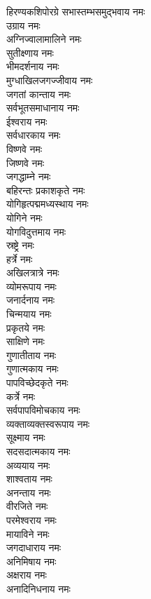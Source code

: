 \begin{multicols}{2}
\begin{flushleft}
हिरण्यकशिपोरग्रे सभास्तम्भसमुद्भवाय नमः\\
उग्राय नमः\hfill{}\\
अग्निज्वालामालिने नमः\\
सुतीक्ष्णाय नमः\\
भीमदर्शनाय नमः\\
मुग्धाखिलजगज्जीवाय नमः\\
जगतां कान्ताय नमः\\
सर्वभूतसमाधानाय नमः\\
ईश्वराय नमः\\
सर्वधारकाय नमः\\
विष्णवे नमः\\
जिष्णवे नमः\hfill{}\\
जगद्धाम्ने नमः\\
बहिरन्तः प्रकाशकृते नमः\\
योगिहृत्पद्ममध्यस्थाय नमः\\
योगिने नमः\\
योगविदुत्तमाय नमः\\
स्रष्ट्रे नमः\\
हर्त्रे नमः\\
अखिलत्रात्रे नमः\\
व्योमरूपाय नमः\\
जनार्दनाय नमः\hfill{}\\
चिन्मयाय नमः\\
प्रकृतये नमः\\
साक्षिणे नमः\\
गुणातीताय नमः\\
गुणात्मकाय नमः\\
पापविच्छेदकृते नमः\\
कर्त्रे नमः\\
सर्वपापविमोचकाय नमः\\
व्यक्ताव्यक्तस्वरूपाय नमः\\
सूक्ष्माय नमः\hfill{}\\
सदसदात्मकाय नमः\\
अव्ययाय नमः\\
शाश्वताय नमः\\
अनन्ताय नमः\\
वीरजिते नमः\\
परमेश्वराय नमः\\
मायाविने नमः\\
जगदाधाराय नमः\\
अनिमिषाय नमः\\
अक्षराय नमः\hfill{}\\
अनादिनिधनाय नमः\\

\end{flushleft}
\end{multicols}
